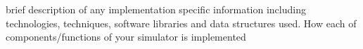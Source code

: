 \begin{itshape}
brief description of any implementation specific information including
technologies, techniques, software libraries and data structures used. How each of components/functions
of your simulator is implemented
\end{itshape}